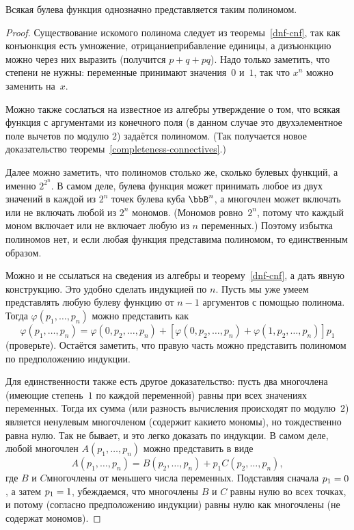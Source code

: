 \begin{theorem}
%
        \label{polynomials-boolean-functions}%
Всякая булева функция однозначно представляется таким полиномом.
\end{theorem}

\begin{proof}
Существование искомого полинома следует из
теоремы~\ref{dnf-cnf}, так как
конъюнкция есть умножение, отрицание\т прибавление единицы, а
дизъюнкцию можно через них выразить (получится $p+q+pq$). Надо
только заметить, что степени не нужны: переменные
принимают значения~$0$ и~$1$, так что $x^n$ можно заменить на~$x$.

Можно также сослаться на известное из алгебры утверждение о том,
что всякая функция с аргументами из конечного поля (в данном
случае это двухэлементное поле вычетов по модулю $2$) задаётся
полиномом. (Так получается новое доказательство
теоремы~\ref{completeness-connectives}.)

Далее можно заметить, что полиномов столько же, сколько
булевых функций, а именно $2^{2^n}$. В самом деле, булева
функция может принимать любое из двух значений в каждой из
$2^n$ точек булева куба $\bbB^n$, а многочлен может включать
или не включать любой из $2^n$ мономов. (Мономов ровно~$2^n$,
потому что каждый моном включает или не включает любую из
$n$ переменных.) Поэтому избытка полиномов нет, и если любая
функция представима полиномом, то единственным образом.

Можно и не ссылаться на сведения из алгебры и
теорему~\ref{dnf-cnf}, а дать явную
конструкцию. Это удобно сделать индукцией по $n$. Пусть мы уже
умеем представлять любую булеву функцию от $n-1$ аргументов с
помощью полинома. Тогда $\varphi(p_1,\dots,p_n)$ можно
представить как
    $$
\varphi(p_1,\dots,p_n) =
\varphi(0, p_2,\dots,p_{n})
+[\varphi(0,p_2,\dots,p_{n})+
\varphi(1,p_2,\dots,p_{n})]p_1
    $$
(проверьте). Остаётся заметить, что правую
часть можно представить полиномом по предположению индукции.

Для единственности также есть другое доказательство: пусть два
многочлена (имеющие степень~$1$ по каждой переменной) равны при
всех значениях переменных. Тогда их сумма (или разность\т
вычисления происходят по модулю~$2$) является ненулевым
многочленом (содержит какие\д то мономы), но тождественно равна
нулю. Так не бывает, и это легко доказать по индукции. В самом
деле, любой многочлен $A(p_1,\dots,p_n)$ можно представить в
виде
        $$
A(p_1,\dots,p_n)=B(p_2,\dots,p_n)+p_1C(p_2,\dots,p_n),
        $$
где $B$ и $C$\т многочлены от меньшего числа переменных.
Подставляя сначала $p_1\hm=0$, а затем $p_1\hm=1$, убеждаемся,
что многочлены $B$ и $C$ равны нулю во всех точках, и потому
(согласно предположению индукции) равны нулю как
многочлены (не содержат мономов).
\end{proof}

